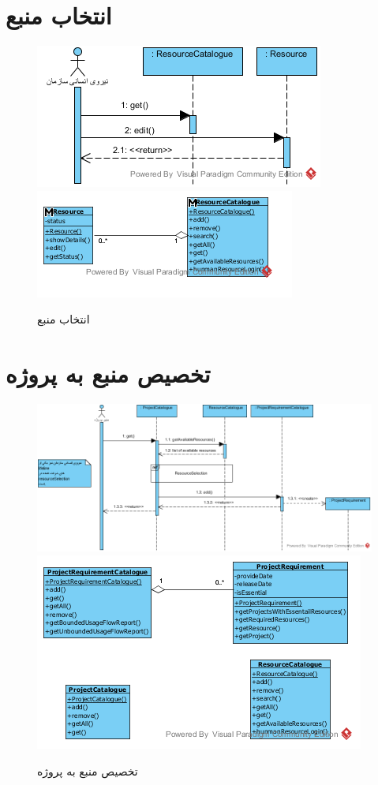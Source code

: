 \section{انتخاب منبع}
\begin{figure}[H]
	\centering
	\includegraphics[scale=0.7]{img/sequence-analysis/ResourceSelection}
	\includegraphics[scale=0.7]{img/sequence-analysis/ResourceSelectionC}
	\caption{انتخاب منبع}
\end{figure}


\section{تخصیص منبع به پروژه}
\begin{figure}[H]
	\centering
	\includegraphics[scale=0.65]{img/sequence-analysis/AllocateResourceToProject}
	\includegraphics[scale=0.65]{img/sequence-analysis/AllocateResourceToProjectC}
	\caption{تخصیص منبع به پروژه}
\end{figure}

